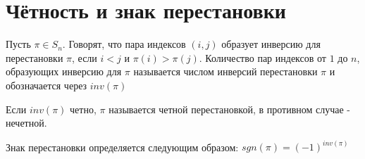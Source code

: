 \section{Чётность и знак перестановки}
\begin{conj}
    Пусть $\pi \in S_n$. Говорят, что пара индексов $(i,j)$ образует инверсию для перестановки
    $\pi$, если $i < j$ и $\pi(i) > \pi(j)$. Количество пар индексов от $1$ до $n$, образующих инверсию для
    $\pi$ называется числом инверсий перестановки $\pi$ и обозначается через $inv(\pi)$
\end{conj}

\begin{conj}
    Если $inv(\pi)$ четно, $\pi$ называется четной перестановкой, в противном случае - нечетной.
\end{conj}

\begin{conj}
    Знак перестановки определяется следующим образом: $sgn(\pi) = (-1)^{inv(\pi)}$
\end{conj}


